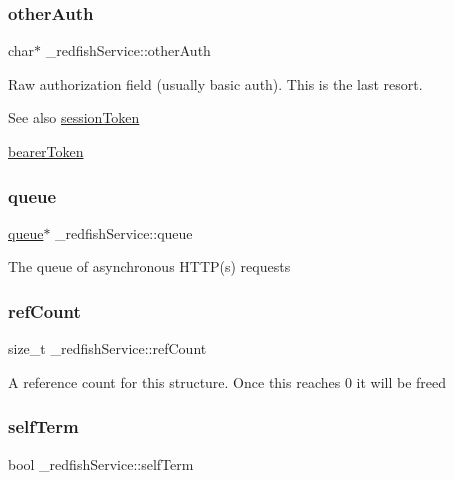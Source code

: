 \subsubsection{\texorpdfstring{other\+Auth}{otherAuth}}
{\footnotesize\ttfamily char$\ast$ \+\_\+redfish\+Service\+::other\+Auth}

Raw authorization field (usually basic auth). This is the last resort.

\begin{DoxySeeAlso}{See also}
\hyperlink{struct__redfishService_ac8aa0c23ac4b611dc593c86be30633bc}{session\+Token} 

\hyperlink{struct__redfishService_a3959db858c9b279bcf379fc0a5eb7419}{bearer\+Token} 
\end{DoxySeeAlso}
\mbox{\label{struct__redfishService_a856c7f92721b1ae76efbb2bbfeae58bf}} 
\subsubsection{\texorpdfstring{queue}{queue}}
{\footnotesize\ttfamily \hyperlink{queue_8h_ae334156b4cde2f884517a660d81450cd}{queue}$\ast$ \+\_\+redfish\+Service\+::queue}

The queue of asynchronous H\+T\+T\+P(s) requests \mbox{\label{struct__redfishService_a0fa4d4e758be848e53743461567c23c1}} 
\subsubsection{\texorpdfstring{ref\+Count}{refCount}}
{\footnotesize\ttfamily size\+\_\+t \+\_\+redfish\+Service\+::ref\+Count}

A reference count for this structure. Once this reaches 0 it will be freed \mbox{\label{struct__redfishService_a84e8b26ce280c1e1a42c1a6b52ff56a1}} 
\subsubsection{\texorpdfstring{self\+Term}{selfTerm}}
{\footnotesize\ttfamily bool \+\_\+redfish\+Service\+::self\+Term}

